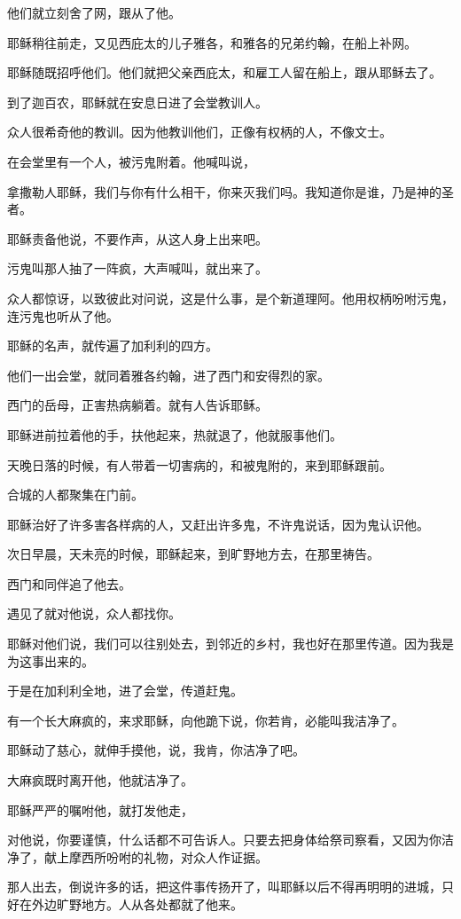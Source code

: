 \documentclass[12pt,oneside]{book}
\begin{document}
他们就立刻舍了网，跟从了他。

耶稣稍往前走，又见西庇太的儿子雅各，和雅各的兄弟约翰，在船上补网。

耶稣随既招呼他们。他们就把父亲西庇太，和雇工人留在船上，跟从耶稣去了。

到了迦百农，耶稣就在安息日进了会堂教训人。

众人很希奇他的教训。因为他教训他们，正像有权柄的人，不像文士。

在会堂里有一个人，被污鬼附着。他喊叫说，

拿撒勒人耶稣，我们与你有什么相干，你来灭我们吗。我知道你是谁，乃是神的圣者。

耶稣责备他说，不要作声，从这人身上出来吧。

污鬼叫那人抽了一阵疯，大声喊叫，就出来了。

众人都惊讶，以致彼此对问说，这是什么事，是个新道理阿。他用权柄吩咐污鬼，连污鬼也听从了他。

耶稣的名声，就传遍了加利利的四方。

他们一出会堂，就同着雅各约翰，进了西门和安得烈的家。

西门的岳母，正害热病躺着。就有人告诉耶稣。

耶稣进前拉着他的手，扶他起来，热就退了，他就服事他们。

天晚日落的时候，有人带着一切害病的，和被鬼附的，来到耶稣跟前。

合城的人都聚集在门前。

耶稣治好了许多害各样病的人，又赶出许多鬼，不许鬼说话，因为鬼认识他。

次日早晨，天未亮的时候，耶稣起来，到旷野地方去，在那里祷告。

西门和同伴追了他去。

遇见了就对他说，众人都找你。

耶稣对他们说，我们可以往别处去，到邻近的乡村，我也好在那里传道。因为我是为这事出来的。

于是在加利利全地，进了会堂，传道赶鬼。

有一个长大麻疯的，来求耶稣，向他跪下说，你若肯，必能叫我洁净了。

耶稣动了慈心，就伸手摸他，说，我肯，你洁净了吧。

大麻疯既时离开他，他就洁净了。

耶稣严严的嘱咐他，就打发他走，

对他说，你要谨慎，什么话都不可告诉人。只要去把身体给祭司察看，又因为你洁净了，献上摩西所吩咐的礼物，对众人作证据。

那人出去，倒说许多的话，把这件事传扬开了，叫耶稣以后不得再明明的进城，只好在外边旷野地方。人从各处都就了他来。
\end{document}
